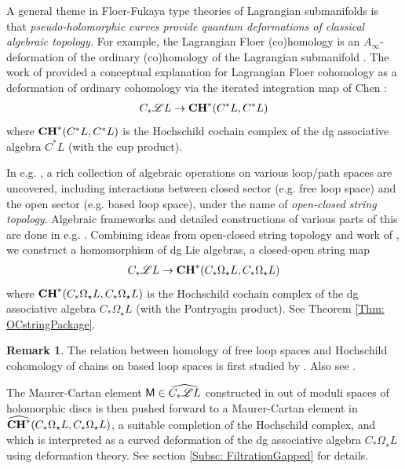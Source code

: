 \documentclass[10pt]{amsart}
\numberwithin{equation}{section}
\theoremstyle{plain}
\theoremstyle{definition}
\newtheorem{remark}[theorem]{Remark}
\theoremstyle{remark}
\numberwithin{equation}{section}
\newcommand{\wh}[1]{\widehat{#1}}
\newcommand{\ms}[1]{\mathscr{#1}}
\newcommand{\CC}{\textbf{\textup{CH}}}
\newcommand{\MM}{\textup{\textsf{M}}}
\begin{document}
{A general theme in Floer-Fukaya type theories of Lagrangian submanifolds is that \emph{pseudo-holomorphic curves provide quantum deformations of classical algebraic topology.}
For example, the Lagrangian Floer (co)homology is an $A_\infty$-deformation of the ordinary (co)homology of the Lagrangian submanifold \cite{FOOO1}. 
The work of \cite{FukayaLagrangian,Irie1,Irie2} provided a conceptual explanation for Lagrangian Floer cohomology as a deformation of ordinary cohomology via the iterated integration map of Chen \cite{ChenIterIntegral}:
\begin{align*}
	C_*\ms{L}L \to \CC^*(C^*L,C^*L)
\end{align*} 
where $\CC^*(C^*L,C^*L)$ is the Hochschild cochain complex of the dg associative algebra $C^*L$ (with the cup product).

In e.g. \cite{ChasSullivan,ChasSullivan2,Sullivan,SullivanStringSurvey}, a rich collection of algebraic operations on various loop/path spaces are uncovered, including interactions between closed sector (e.g. free loop space) and the open sector (e.g. based loop space), under the name of \emph{open-closed string topology}. 
Algebraic frameworks and detailed constructions of various parts of this are done in e.g. \cite{MooreSegal,CostelloTCFT,Godin,BlumbergCohenTeleman,CohenGanatra}.
Combining ideas from open-closed string topology and work of \cite{FukayaLagrangian,Irie2}, we construct a homomorphism of dg Lie algebras, a closed-open string map
\begin{align}\label{Eq: StringTopOCMap}
	C_*\ms{L}L \to \CC^*(C_*\Omega_\star L, C_*\Omega_\star L)
\end{align}
where $\CC^*(C_*\Omega_\star L, C_*\Omega_\star L)$ is the Hochschild cochain complex of the dg associative algebra $C_*\Omega_\star L$ (with the Pontryagin product). See Theorem \ref{Thm: OCstringPackage}.

\begin{remark}
	The relation between homology of free loop spaces and Hochschild cohomology of chains on based loop spaces is first studied by \cite{Goodwillie,BurgheleaFiedorowicz}. Also see \cite{MalmThesis}.
\end{remark}

The Maurer-Cartan element $\MM\in \wh{C_*\ms{L}L}$ constructed in \cite{FukayaLagrangian,Irie2} out of moduli spaces of holomorphic discs is then pushed forward to a Maurer-Cartan element in $\wh{\CC^*}(C_*\Omega_\star L, C_*\Omega_\star L)$, a suitable completion of the Hochschild complex, and which is interpreted as a curved deformation of the dg associative algebra $C_*\Omega_\star L$ using deformation theory. See section \ref{Subsc: FiltrationGapped} for details.

}
\end{document}

